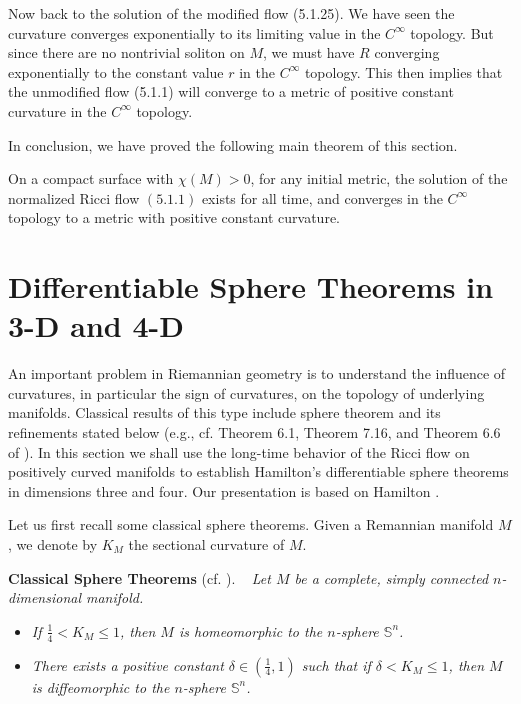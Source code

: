 Now back to the solution of the modified flow (5.1.25). We have
seen the curvature converges exponentially to its limiting value
in the $C^\infty$ topology. But since there are no nontrivial
soliton on $M$, we must have $R$ converging exponentially to the
constant value $r$ in the $C^\infty$ topology. This then implies
that the unmodified flow (5.1.1) will converge to a metric of
positive constant curvature in the $C^\infty$ topology.

In conclusion, we have proved the following main theorem of this
section.

\begin{theorem}
  \label{thm:cz-positive-euler-surface-convergence}

On a compact surface with $\chi(M)>0$, for any initial metric, the
solution of the normalized Ricci flow $(5.1.1)$ exists for all
time, and converges in the $C^\infty$ topology to a metric with
positive constant curvature.
\end{theorem}


\section{Differentiable Sphere Theorems in 3-D and 4-D}

An important problem in Riemannian geometry is to understand the
influence of curvatures, in particular the sign of curvatures, on
the topology of underlying manifolds. Classical results of this
type include sphere theorem and its refinements stated below
(e.g., cf. Theorem 6.1, Theorem 7.16, and Theorem 6.6 of
\cite{CE}). In this section we shall use the long-time behavior of
the Ricci flow on positively curved manifolds to establish
Hamilton's differentiable sphere theorems in dimensions three and
four. Our presentation is based on Hamilton \cite{Ha82, Ha86}.

Let us first recall some classical sphere theorems. Given a
Remannian manifold $M$, we denote by $K_M$ the sectional curvature
of $M$.

\medskip
{\bf Classical Sphere Theorems} (cf. \cite{CE}). \ \emph{ Let $M$ be a complete, simply connected
$n$-dimensional manifold.}
\begin{itemize}
\item[(i)] \emph{If $\frac{1}{4}<K_M\le 1$, then $M$ is
homeomorphic to the $n$-sphere $\mathbb{S}^n$.} \item[(ii)]
\emph{There exists a positive constant $\delta\in(\frac{1}{4},1)$
such that if $\delta<K_M\le 1$, then $M$ is diffeomorphic to the
$n$-sphere $\mathbb{S}^n$.}
\end{itemize}

